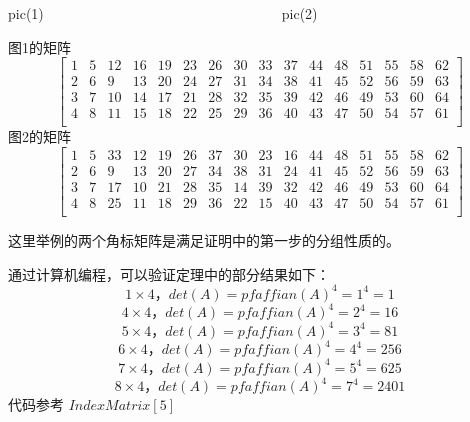 \documentclass[twoside,a4paper,CCT]{cctart}   %
\begin{document}
\begin{center}
pic(1)\ \ \ \ \ \ \ \ \ \ \ \ \ \ \ \ \ \ \ \ \ \ \ \ \ \ \ \ \ \ \ \ \ \ pic(2)
\end{center}
图1的矩阵
$$\begin{bmatrix}
1&5&12&16&19&23&26&30&33&37&44&48&51&55&58&62\\
2&6&9&13&20&24&27&31&34&38&41&45&52&56&59&63\\
3&7&10&14&17&21&28&32&35&39&42&46&49&53&60&64\\
4&8&11&15&18&22&25&29&36&40&43&47&50&54&57&61\\\end{bmatrix}$$
图2的矩阵
$$\begin{bmatrix}
1&5&33&12&19&26&37&30&23&16&44&48&51&55&58&62\\
2&6&9&13&20&27&34&38&31&24&41&45&52&56&59&63\\
3&7&17&10&21&28&35&14&39&32&42&46&49&53&60&64\\
4&8&25&11&18&29&36&22&15&40&43&47&50&54&57&61\\\end{bmatrix}$$

这里举例的两个角标矩阵是满足证明中的第一步的分组性质的。

通过计算机编程，可以验证定理中的部分结果如下：
$$1 \times4，det(A) = pfaffian(A)^{4} = 1^{4}=1$$
$$4 \times4，det(A) = pfaffian(A)^{4} = 2^{4}=16$$
$$5 \times4，det(A) = pfaffian(A)^{4} = 3^{4}=81$$
$$6 \times4，det(A) = pfaffian(A)^{4} = 4^{4}=256$$
$$7 \times4，det(A) = pfaffian(A)^{4} = 5^{4}=625$$
$$8 \times4，det(A) = pfaffian(A)^{4} = 7^{4}=2401$$
代码参考 ${IndexMatrix[5]}$
\end{document}
